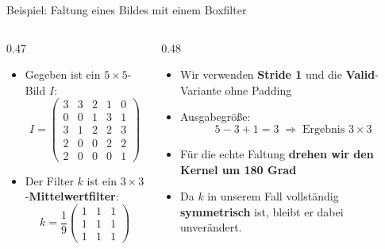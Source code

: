 {%
\begin{frame}{Beispiel: Faltung eines Bildes mit einem Boxfilter}
\begin{columns}
\begin{column}{0.47\textwidth}
\begin{itemize}
    \item Gegeben ist ein $5 \times 5$-Bild $I$:
    \[
        I = \begin{pmatrix}
            3 & 3 & 2 & 1 & 0 \\
            0 & 0 & 1 & 3 & 1 \\
            3 & 1 & 2 & 2 & 3 \\
            2 & 0 & 0 & 2 & 2 \\
            2 & 0 & 0 & 0 & 1
        \end{pmatrix}
    \]
    \item Der Filter $k$ ist ein $3 \times 3$-\textbf{Mittelwertfilter}:
    \[
        k = \frac{1}{9}
        \begin{pmatrix} 1 & 1 & 1 \\ 1 & 1 & 1 \\ 1 & 1 & 1 \end{pmatrix}
    \]
\end{itemize}
\end{column}
\begin{column}{0.48\textwidth}
\begin{itemize}
    \item Wir verwenden \textbf{Stride 1} und die \textbf{Valid}-Variante ohne Padding
    \item Ausgabegröße:
    \[
        5 - 3 + 1 = 3 \;\Rightarrow\; \text{Ergebnis } 3 \times 3
    \]
    \item Für die echte Faltung \textbf{drehen wir den Kernel um 180 Grad}
    \item Da $k$ in unserem Fall vollständig \textbf{symmetrisch} ist, bleibt er dabei unverändert.
\end{itemize}
\end{column}
\end{columns}
\end{frame}

}
